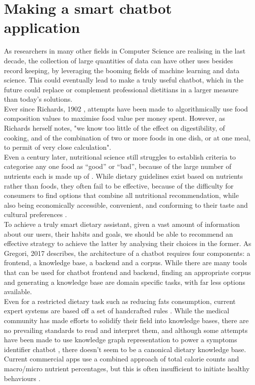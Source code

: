 \section{Making a smart chatbot application}
As researchers in many other fields in Computer Science are realising in the last decade, the collection of large quantities of data can have other uses besides record keeping, by leveraging the booming fields of machine learning and data science. This could eventually lead to make a truly useful chatbot, which in the future could replace or complement professional dietitians in a larger measure than today's solutions. \\
Ever since Richards, 1902 \cite{Richards1902a}, attempts have been made to algorithmically use food composition values to maximise food value per money spent. However, as Richards herself notes, "we know too little of the effect on digestibility, of cooking, and of the combination of two or more foods in one dish, or at one meal, to permit of very close calculation". \\
Even a century later, nutritional science still struggles to establish criteria to categorise any one food as ``good'' or ``bad'', because of the large number of nutrients each is made up of \cite{USDAFoodandNutritionService2007}. While dietary guidelines exist based on nutrients rather than foods, they often fail to be effective, because of the difficulty for consumers to find options that combine all nutritional recommendation, while also being economically accessible, convenient, and conforming to their taste and cultural preferences \cite{Green2015}. \\
To achieve a truly smart dietary assistant, given a vast amount of information about our users, their habits and goals, we should be able to recommend an effective strategy to achieve the latter by analysing their choices in the former. As Gregori, 2017 \cite{Gregori} describes, the architecture of a chatbot requires four components: a frontend, a knowledge base, a backend and a corpus. While there are many tools that can be used for chatbot frontend and backend, finding an appropriate corpus and generating a knowledge base are domain specific tasks, with far less options available. \\
Even for a restricted dietary task such as reducing fats consumption, current expert systems are based off a set of handcrafted rules \cite{Prochaska2005}. While the medical community has made efforts to solidify their field into knowledge bases, there are no prevailing standards to read and interpret them, and although some attempts have been made to use knowledge graph representation to power a symptoms identifier chatbot \cite{minutoloa2017conversational}, there doesn't seem to be a canonical dietary knowledge base. Current commercial apps use a combined approach of total calorie counts and macro/micro nutrient percentages, but this is often insufficient to initiate healthy behaviours \cite{Davis2016}. \\
